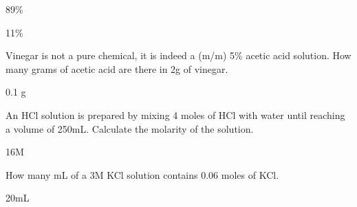 \documentclass[main.tex]{subfiles}
\begin{document}
\begin{multicols*}{2}
\begin{solution}
\begin{inparaenum}[(a)]
 \item  89\%
  \item 11\%
 \end{inparaenum} 
 \hspace{0.1cm}\end{solution}
\begin{question}[ID=\the\value{numA}]
Vinegar is not a pure chemical, it is indeed a (m/m) 5\% acetic acid solution. How many grams of acetic acid are there in 2g of vinegar.
\end{question}
\begin{solution}
0.1 g
 \hspace{0.1cm}\end{solution}
\begin{question}[ID=\the\value{numA}]
An HCl solution is prepared by mixing 4 moles of HCl with water until reaching a volume of 250mL. Calculate the molarity of the solution.
\end{question}
\begin{solution}
16M
 \hspace{0.1cm}\end{solution}
\begin{question}[ID=\the\value{numA}]
How many mL of a 3M KCl solution contains 0.06 moles of KCl. 
\end{question}\begin{solution}
20mL
 \hspace{0.1cm}\end{solution}
\begin{question}[ID=\the\value{numA}]

\end{question}
\end{multicols*}
\end{document}
